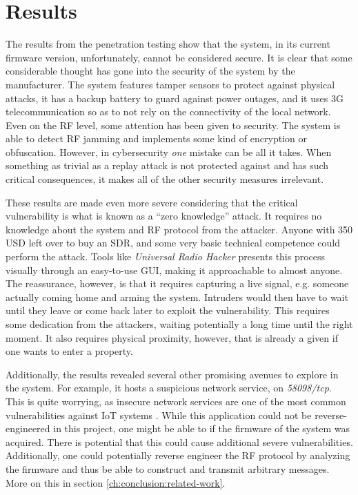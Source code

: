 \section{Results}
The results from the penetration testing show that the system, in its current firmware version, unfortunately, cannot be considered secure. It is clear that some considerable thought has gone into the security of the system by the manufacturer. The system features tamper sensors to protect against physical attacks, it has a backup battery to guard against power outages, and it uses 3G telecommunication so as to not rely on the connectivity of the local network. Even on the RF level, some attention has been given to security. The system is able to detect RF jamming and implements some kind of encryption or obfuscation. However, in cybersecurity \textit{one} mistake can be all it takes. When something as trivial as a replay attack is not protected against and has such critical consequences, it makes all of the other security measures irrelevant.

These results are made even more severe considering that the critical vulnerability is what is known as a \enquote{zero knowledge} attack. It requires no knowledge about the system and RF protocol from the attacker. Anyone with 350 USD left over to buy an SDR, and some very basic technical competence could perform the attack. Tools like \textit{Universal Radio Hacker} \cite{urh-paper} presents this process visually through an easy-to-use GUI, making it approachable to almost anyone. The reassurance, however, is that it requires capturing a live signal, e.g. someone actually coming home and arming the system. Intruders would then have to wait until they leave or come back later to exploit the vulnerability. This requires some dedication from the attackers, waiting potentially a long time until the right moment. It also requires physical proximity, however, that is already a given if one wants to enter a property.

Additionally, the results revealed several other promising avenues to explore in the system. For example, it hosts a suspicious network service, on \textit{58098/tcp}. This is quite worrying, as insecure network services are one of the most common vulnerabilities against IoT systems \cite{owasp-iot-top10, etsi-iot-standard}. While this application could not be reverse-engineered in this project, one might be able to if the firmware of the system was acquired. There is potential that this could cause additional severe vulnerabilities. Additionally, one could potentially reverse engineer the RF protocol by analyzing the firmware and thus be able to construct and transmit arbitrary messages. More on this in section \ref{ch:conclusion:related-work}.

